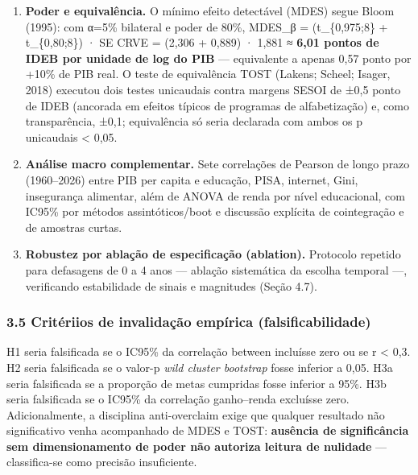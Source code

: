 \documentclass[
  brazilian,
  12pt,
  a4paper,
]{article}
\begin{document}
\begin{enumerate}
  observações e reportou-se a correlação \textbf{dentro} de \emph{m} (12
  obs.: 6 anos × 2 etapas). Trata-se de diagnóstico de co-tendência
  intra-unidade --- não replica a associação transversal nem constitui
  validação externa.
\item
  \textbf{Poder e equivalência.} O mínimo efeito detectável (MDES) segue
  Bloom (1995): com α=5\% bilateral e poder de 80\%, MDES\_β =
  (t\_\{0,975;8\} + t\_\{0,80;8\}) · SE CRVE = (2,306 + 0,889) · 1,881 ≈
  \textbf{6,01 pontos de IDEB por unidade de log do PIB} --- equivalente
  a apenas 0,57 ponto por +10\% de PIB real. O teste de equivalência
  TOST (Lakens; Scheel; Isager, 2018) executou dois testes unicaudais
  contra margens SESOI de ±0,5 ponto de IDEB (ancorada em efeitos
  típicos de programas de alfabetização) e, como transparência, ±0,1;
  equivalência só seria declarada com ambos os p unicaudais \textless{}
  0,05.
\item
  \textbf{Análise macro complementar.} Sete correlações de Pearson de
  longo prazo (1960--2026) entre PIB per capita e educação, PISA,
  internet, Gini, insegurança alimentar, além de ANOVA de renda por
  nível educacional, com IC95\% por métodos assintóticos/boot e
  discussão explícita de cointegração e de amostras curtas.
\item
  \textbf{Robustez por ablação de especificação (ablation).} Protocolo
  repetido para defasagens de 0 a 4 anos --- ablação sistemática da
  escolha temporal ---, verificando estabilidade de sinais e magnitudes
  (Seção 4.7).
\end{enumerate}

\subsubsection{3.5 Critériios de invalidação empírica
(falsificabilidade)}\label{crituxe9riios-de-invalidauxe7uxe3o-empuxedrica-falsificabilidade}

H1 seria falsificada se o IC95\% da correlação between incluísse zero ou
se r \textless{} 0,3. H2 seria falsificada se o valor-p \emph{wild
cluster bootstrap} fosse inferior a 0,05. H3a seria falsificada se a
proporção de metas cumpridas fosse inferior a 95\%. H3b seria
falsificada se o IC95\% da correlação ganho--renda excluísse zero.
Adicionalmente, a disciplina anti-overclaim exige que qualquer resultado
não significativo venha acompanhado de MDES e TOST: \textbf{ausência de
significância sem dimensionamento de poder não autoriza leitura de
nulidade} --- classifica-se como precisão insuficiente.
\end{document}
